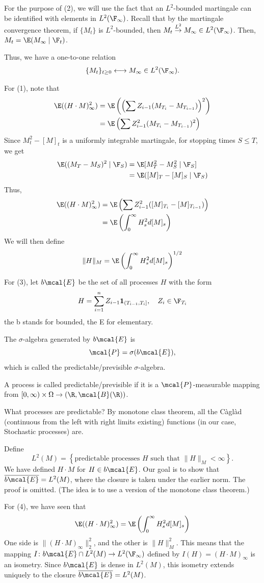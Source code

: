 For the purpose of (2), 
we will use the fact that an $L^2$-bounded martingale can be identified with elements in $L^2(\F_\infty)$. 
Recall that by the martingale convergence theorem, if $\{M_t\}$ is $L^2$-bounded, then $M_t \overset{L^2}{\to} M_\infty \in L^2(\F_\infty)$. Then, $M_t = \E(M_\infty \mid \F_t)$. 

Thus, we have a one-to-one relation 
\[
\{M_t\}_{t \ge 0} \longleftrightarrow M_\infty \in L^2(\F_\infty). 
\]

For (1), note that
\begin{align*}
\E((H \cdot M)_\infty^2) &= \E\left(\left(\sum Z_{i-1}(M_{T_i} - M_{T_{i-1}})\right)^2\right) \\ 
&= \E \left( \sum Z_{i-1}^2 (M_{T_i}-M_{T_{i-1}})^2\right)
\end{align*}
Since $M_t^2 - [M]_t$ is a uniformly integrable martingale, for stopping times $S \le T$, we get 
\begin{align*}
\E((M_T-M_S)^2 \mid \F_S) &= \E[M_T^2-M_S^2 \mid \F_S] \\ 
&= \E([M]_T - [M]_S \mid \F_S)
\end{align*}
Thus, 
\begin{align*}
\E((H \cdot M)_\infty^2) &= \E\left(\sum Z_{i-1}^2([M]_{T_i} - [M]_{T_{i-1}})\right)  \\ 
&= \E \left(\int_0^\infty H_s^2 d[M]_s \right)
\end{align*}
We will then define 
\[
\|H\|_M  = \E \left(\int_0^\infty H_s^2 d[M]_s \right)^{1/2}
\]

For (3), let $b\mcal{E}$ be the set of all processes $H$ with the form 
\[
H = \sum_{i=1}^n Z_{i-1} \mathbf{1}_{(T_{i-1}, T_{i}]}, \quad Z_i \in \F_{T_i}
\]
the b stands for bounded, the E for elementary. 

\begin{definition}
The $\sigma$-algebra generated by $b\mcal{E}$ is 
\[
\mcal{P} = \sigma(b \mcal{E}),
\]
which is called the predictable/previsible $\sigma$-algebra.
\end{definition}

A process is called predictable/previsible if it is a $\mcal{P}$-measurable mapping from $[0, \infty) \times \Omega \to (\R, \mcal{B}(\R))$.

What processes are predictable? By monotone class theorem, all the Càglàd (continuous from the left with right limits existing) functions (in our case, Stochastic processes) are.

Define 
\[
L^2(M) = \left\{\text{predictable processes } H \text{ such that } \|H\|_M < \infty \right\}.
\]
We have defined $H \cdot M$ for $H \in b\mcal{E}$. Our goal is to show that $\overline{b \mcal{E}} = L^2(M)$, where the closure is taken under the earlier norm. 
The proof is omitted. (The idea is to use a version of the monotone class theorem.)

For (4), we have seen that 
\[
\E((H \cdot M)_\infty^2) =
 \E \left(\int_0^\infty H_s^2 d[M]_s \right)
\]
One side is $\|(H \cdot M)_\infty\|_2^2$, and the other is $\|H\|_M^2$. This means that the mapping $I \colon b\mcal{E} \cap L^2(M) \to L^2(\F_\infty)$ defined by $I(H) = (H \cdot M)_\infty$ is an isometry. Since $b\mcal{E}$ is dense in $L^2(M)$, this isometry extends uniquely to the closure $\overline{b \mcal{E}} = L^2(M)$.
